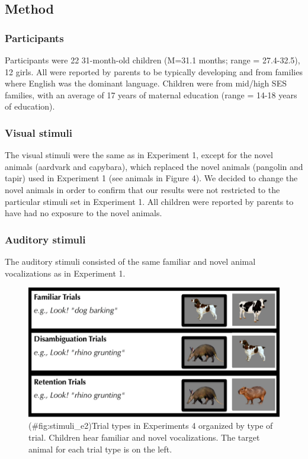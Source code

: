 \documentclass[english,floatsintext,man]{apa6}
\theoremstyle{definition}
\theoremstyle{definition}
\theoremstyle{definition}
\theoremstyle{remark}
\begin{document}
\subsection{Method}\label{method-1}

\subsubsection{Participants}\label{participants-1}

Participants were 22 31-month-old children (M=31.1 months; range =
27.4-32.5), 12 girls. All were reported by parents to be typically
developing and from families where English was the dominant language.
Children were from mid/high SES families, with an average of 17 years of
maternal education (range = 14-18 years of education).

\subsubsection{Visual stimuli}\label{visual-stimuli-1}

The visual stimuli were the same as in Experiment 1, except for the
novel animals (aardvark and capybara), which replaced the novel animals
(pangolin and tapir) used in Experiment 1 (see animals in Figure 4). We
decided to change the novel animals in order to confirm that our results
were not restricted to the particular stimuli set in Experiment 1. All
children were reported by parents to have had no exposure to the novel
animals.

\subsubsection{Auditory stimuli}\label{auditory-stimuli-1}

The auditory stimuli consisted of the same familiar and novel animal
vocalizations as in Experiment 1.

\begin{figure}
\centering
\includegraphics{anime_manuscript_files/figure-latex/stimuli_e2-1.pdf}
\caption{(\#fig:stimuli\_e2)Trial types in Experiments 4 organized by
type of trial. Children hear familiar and novel vocalizations. The
target animal for each trial type is on the left.}
\end{figure}
\end{document}
